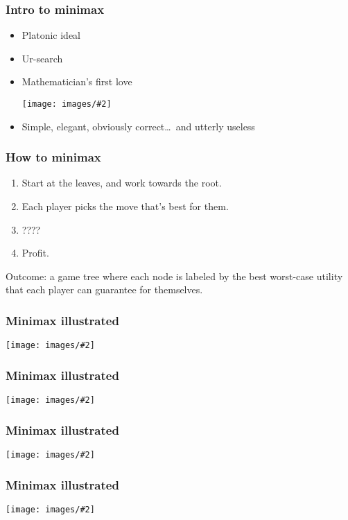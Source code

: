 \documentclass[table]{beamer}
\newcommand\img[2]{\texttt{[image: images/\#2]}}
\begin{document}
\begin{frame}
	\frametitle{Intro to minimax}
	\begin{itemize}
		\item Platonic ideal
		\item Ur-search
		\item Mathematician's first love
			\pause
			\begin{center}
				\img{0.15}{superman.jpg}
			\end{center}
			\pause
		\item Simple, elegant, obviously correct\pause\ldots\ and
			{\color{alertred}utterly useless}
	\end{itemize}
\end{frame}

\begin{frame}
	\frametitle{How to minimax}
	\begin{enumerate}
		\item Start at the leaves, and work towards the root.
		\item Each player picks the move that's best for them.
		\item ????
		\item Profit.
	\end{enumerate}

	\vspace{5ex}

	Outcome: a game tree where each node is labeled by the \alert{best
	worst-case} utility that each player can guarantee for themselves.
\end{frame}

\begin{frame}
	\frametitle{Minimax illustrated}
	\begin{center}
		\img{1}{games-1.jpg}
	\end{center}
\end{frame}

\begin{frame}
	\frametitle{Minimax illustrated}
	\begin{center}
		\img{1}{games-2.jpg}
	\end{center}
\end{frame}

\begin{frame}
	\frametitle{Minimax illustrated}
	\begin{center}
		\img{1}{games-3.jpg}
	\end{center}
\end{frame}

\begin{frame}
	\frametitle{Minimax illustrated}
	\begin{center}
		\img{1}{games-4.jpg}
	\end{center}
\end{frame}
\end{document}
